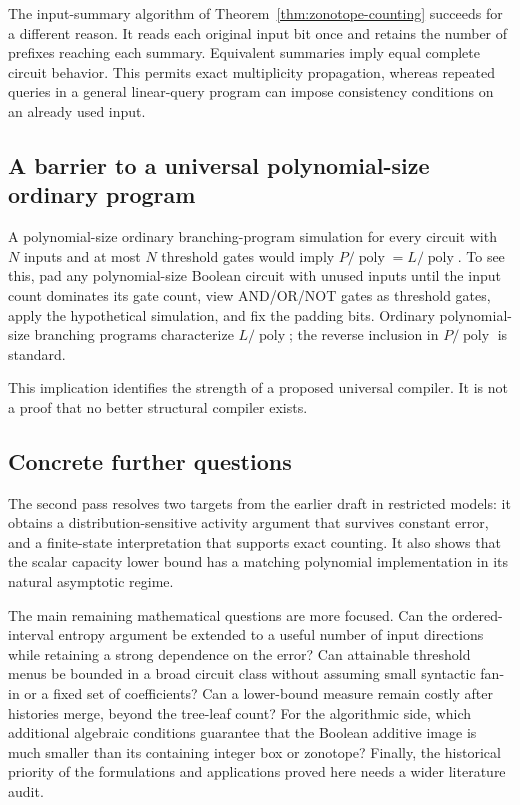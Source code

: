 \documentclass[11pt]{article}
\theoremstyle{definition}
\newcommand{\poly}{\operatorname{poly}}
\begin{document}
The input-summary algorithm of Theorem~\ref{thm:zonotope-counting} succeeds for a different reason. It reads each original input bit once and retains the number of prefixes reaching each summary. Equivalent summaries imply equal complete circuit behavior. This permits exact multiplicity propagation, whereas repeated queries in a general linear-query program can impose consistency conditions on an already used input.

\subsection{A barrier to a universal polynomial-size ordinary program}
A polynomial-size ordinary branching-program simulation for every circuit with \(N\) inputs and at most \(N\) threshold gates would imply
\(P/\poly=L/\poly\). To see this, pad any polynomial-size Boolean circuit with unused inputs until the input count dominates its gate count, view AND/OR/NOT gates as threshold gates, apply the hypothetical simulation, and fix the padding bits. Ordinary polynomial-size branching programs characterize \(L/\poly\); the reverse inclusion in \(P/\poly\) is standard.

This implication identifies the strength of a proposed universal compiler. It is not a proof that no better structural compiler exists.

\subsection{Concrete further questions}
The second pass resolves two targets from the earlier draft in restricted models: it obtains a distribution-sensitive activity argument that survives constant error, and a finite-state interpretation that supports exact counting. It also shows that the scalar capacity lower bound has a matching polynomial implementation in its natural asymptotic regime.

The main remaining mathematical questions are more focused. Can the ordered-interval entropy argument be extended to a useful number of input directions while retaining a strong dependence on the error? Can attainable threshold menus be bounded in a broad circuit class without assuming small syntactic fan-in or a fixed set of coefficients? Can a lower-bound measure remain costly after histories merge, beyond the tree-leaf count? For the algorithmic side, which additional algebraic conditions guarantee that the Boolean additive image is much smaller than its containing integer box or zonotope? Finally, the historical priority of the formulations and applications proved here needs a wider literature audit.
\end{document}
